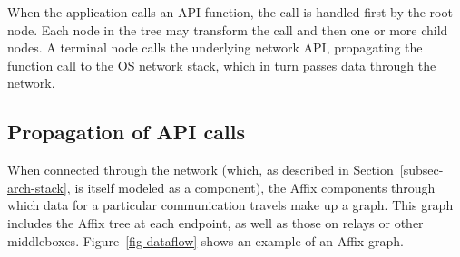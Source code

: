 When the application calls an 
API function, the call is handled first by the root node.
Each node in the tree may transform the call
and then one or more child nodes. A
terminal node calls the underlying network API, propagating 
the function call to the \ac{OS} network stack, which in turn 
passes data through the network. 






\subsection{Propagation of API calls}
\label{subsec-arch-flow}

When connected through the network (which, 
as described in Section~\ref{subsec-arch-stack}, is itself
modeled as a component), 
the Affix components through which data 
for a particular communication travels make up 
a graph. This graph includes the Affix 
tree at each endpoint, as well as those on relays 
or other middleboxes. 
Figure~\ref{fig-dataflow} shows an example of an Affix graph.

